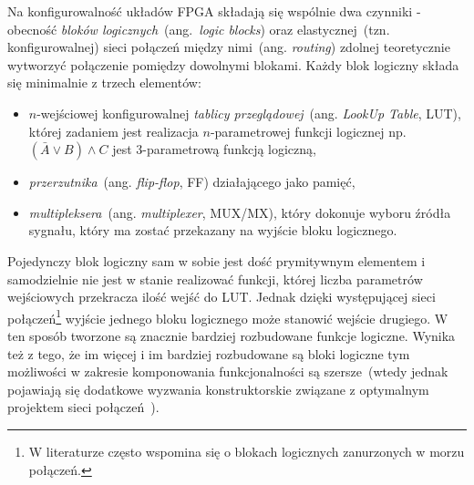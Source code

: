 Na konfigurowalność układów FPGA składają się wspólnie dwa czynniki - obecność \textit{bloków logicznych}~(ang.~\textit{logic blocks}) oraz elastycznej~(tzn. konfigurowalnej) sieci połączeń między nimi~(ang. \textit{routing}) zdolnej teoretycznie wytworzyć połączenie pomiędzy dowolnymi blokami.
Każdy blok logiczny składa się minimalnie z trzech elementów:
\begin{itemize}
\item $n$-wejściowej konfigurowalnej \textit{tablicy przeglądowej}~(ang. \textit{LookUp Table}, LUT), której zadaniem jest realizacja $n$-parametrowej funkcji logicznej np. $(\bar{A}\vee B) \wedge C$ jest 3-parametrową funkcją logiczną,
\item \textit{przerzutnika}~(ang. \textit{flip-flop}, FF) działającego jako pamięć,
\item \textit{multipleksera}~(ang. \textit{multiplexer}, MUX/MX), który dokonuje wyboru źródła sygnału, który ma zostać przekazany na wyjście bloku logicznego.
\end{itemize}
Pojedynczy blok logiczny sam w sobie jest dość prymitywnym elementem i samodzielnie nie jest w stanie realizować funkcji, której liczba parametrów wejściowych przekracza ilość wejść do LUT. Jednak dzięki występującej sieci połączeń\footnote{W literaturze często wspomina się o blokach logicznych zanurzonych w morzu połączeń.} wyjście jednego bloku logicznego może stanowić wejście drugiego. W ten sposób tworzone są znacznie bardziej rozbudowane funkcje logiczne. Wynika też z tego, że im więcej i im bardziej rozbudowane są bloki logiczne tym możliwości w zakresie komponowania funkcjonalności są szersze~(wtedy jednak pojawiają się dodatkowe wyzwania konstruktorskie związane z optymalnym projektem sieci połączeń~\cite{FPGA_ARCHITECTURE}).
